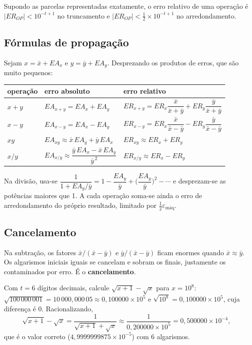 Supondo as parcelas representadas exatamente, o erro relativo de uma operação é
$|ER_{OP}|<10^{-t+1}$ no truncamento e $|ER_{OP}|<\tfrac12\times10^{-t+1}$ no arredondamento.

\subsection{Fórmulas de propagação}

Sejam $x=\bar x+EA_x$ e $y=\bar y+EA_y$. Desprezando os produtos de erros, que são muito pequenos:

\begin{center}
\renewcommand{\arraystretch}{2}
\begin{tabular}{lll}
\toprule
operação & erro absoluto & erro relativo\\
\midrule
$x+y$ & $EA_{x+y}=EA_x+EA_y$ & $ER_{x+y}=ER_x\dfrac{\bar x}{\bar x+\bar y}+ER_y\dfrac{\bar y}{\bar x+\bar y}$\\
$x-y$ & $EA_{x-y}=EA_x-EA_y$ & $ER_{x-y}=ER_x\dfrac{\bar x}{\bar x-\bar y}-ER_y\dfrac{\bar y}{\bar x-\bar y}$\\
$xy$  & $EA_{xy}\approx\bar x\,EA_y+\bar y\,EA_x$ & $ER_{xy}\approx ER_x+ER_y$\\
$x/y$ & $EA_{x/y}\approx\dfrac{\bar y\,EA_x-\bar x\,EA_y}{\bar y^{\,2}}$ & $ER_{x/y}\approx ER_x-ER_y$\\
\bottomrule
\end{tabular}
\end{center}

Na divisão, usa-se $\dfrac1{1+EA_y/\bar y}=1-\dfrac{EA_y}{\bar y}+\Big(\dfrac{EA_y}{\bar y}\Big)^2-\cdots$ e
desprezam-se as potências maiores que 1. A cada operação soma-se ainda o erro de arredondamento do próprio
resultado, limitado por $\tfrac12\varepsilon_{\text{máq}}$.

\subsection{Cancelamento}

Na subtração, os fatores $\bar x/(\bar x-\bar y)$ e $\bar y/(\bar x-\bar y)$ ficam enormes quando
$\bar x\approx\bar y$. Os algarismos iniciais iguais se cancelam e sobram os finais, justamente os
contaminados por erro. É o \textbf{cancelamento}.

\begin{exemplo}
Com $t=6$ dígitos decimais, calcule $\sqrt{x+1}-\sqrt{x}$ para $x=10^{8}$:
$\sqrt{100\,000\,001}=10\,000{,}000\,05\approx0{,}100000\times10^{5}$ e $\sqrt{10^8}=0{,}100000\times10^{5}$, cuja
diferença é $0$. Racionalizando,
\[
\sqrt{x+1}-\sqrt{x}=\frac{1}{\sqrt{x+1}+\sqrt{x}}\approx\frac1{0{,}200000\times10^{5}}=0{,}500000\times10^{-4},
\]
que é o valor correto ($4{,}9999999875\times10^{-5}$) com 6 algarismos.
\end{exemplo}


